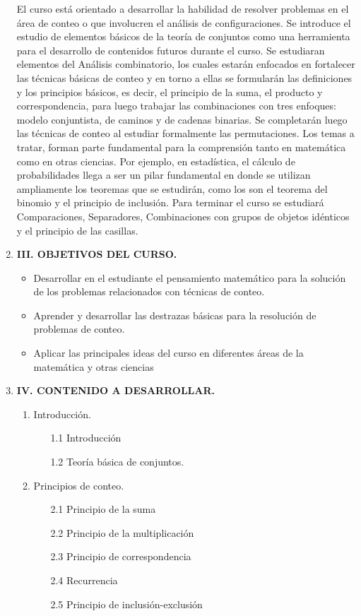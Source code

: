 \begin{enumerate}
El curso está orientado a desarrollar la habilidad de resolver problemas en el área de conteo o
que involucren el análisis de configuraciones. Se introduce el estudio de elementos básicos de
la teoría de conjuntos como una herramienta para el desarrollo de contenidos futuros durante
el curso. Se estudiaran elementos del  Análisis combinatorio, los cuales estarán enfocados
en fortalecer las técnicas básicas de conteo y en torno a ellas se formularán las definiciones
y los principios básicos, es decir, el principio de la suma, el producto y correspondencia, para
luego trabajar las combinaciones con tres enfoques: modelo conjuntista, de caminos y de cadenas
binarias. Se completarán luego las técnicas de conteo al estudiar formalmente las permutaciones. Los temas
a tratar, forman parte fundamental para la comprensión tanto en
matemática como en otras ciencias. Por ejemplo, en estadística, el cálculo de probabilidades llega
a ser un pilar fundamental en donde se utilizan ampliamente los teoremas que se estudirán, como
los son el teorema del binomio y el principio de inclusión. Para terminar el curso se estudiará
Comparaciones, Separadores, Combinaciones con grupos de objetos idénticos y el principio de las casillas.




\item {\bf \large  III. OBJETIVOS DEL CURSO.}

\begin{itemize}
\item Desarrollar en el estudiante el pensamiento matemático para la solución de los problemas relacionados con técnicas de conteo.
\item  Aprender y desarrollar las destrazas básicas para la resolución de problemas de conteo. 
\item Aplicar las principales ideas del curso en diferentes áreas de la matemática y otras ciencias
\end{itemize}

\newpage 
\item {\bf \large IV. CONTENIDO A DESARROLLAR.}

\begin{enumerate}
\item Introducci\'on.
    
\begin{enumerate}[ ]
\item [1.1] Introducción
\item [1.2]  Teoría básica de conjuntos.
\end{enumerate}
   \item  Principios de conteo.
   \begin{enumerate}[ ]
       \item [2.1] Principio de la suma
       \item [2.2] Principio de la multiplicaci\'on
       \item [2.3] Principio de correspondencia
       \item [2.4] Recurrencia
       \item [2.5] Principio de inclusión-exclusión
   \end{enumerate}


\end{enumerate}
\end{enumerate}
